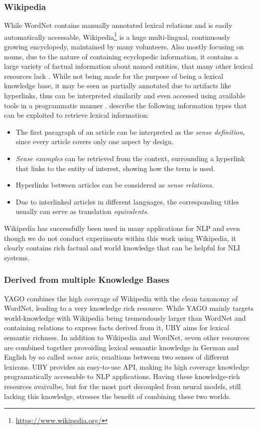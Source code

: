 \subsubsection{Wikipedia}\label{sec:wikipedia}
While WordNet contains manually annotated lexical relations and is easily automatically accessable, Wikipedia\footnote{\href{https://www.wikipedia.org/}{https://www.wikipedia.org/}} is a huge multi-lingual, continuously growing  encyclopedy, maintained by many volunteers. Also mostly focusing on nouns, due to the nature of containing ecyclopedic information, it contains a large variety of factual information about named entities, that many other lexical resources lack \citep{gurevych2016linked}. While not being made for the purpose of being a lexical knowledge base, it may be seen as partially annotated due to artifacts like hyperlinks, thus can be interpreted similarily and even accessed using available tools in a programmatic manner \citep{zesch2008extracting}.  \cite{gurevych2016linked} describe the following information types that can be exploited to retrieve lexical information:
\begin{itemize}
\item The first paragraph of an article can be interpreted as the \textit{sense definition}, since every article covers only one aspect by design.
\item \textit{Sense examples} can be retrieved from the context, surrounding a hyperlink that links to the entity of interest, showing how the term is used.
\item Hyperlinks between articles can be considered as \textit{sense relations}.
\item Due to interlinked articles in different languages, the corresponding titles usually can serve as translation \textit{equivalents}.
\end{itemize}
Wikipedia has successfully been used in many applications for \ac{NLP} and even though we do not conduct experiments within this work using Wikipedia, it clearly contains rich factual and world knowledge that can be helpful for \ac{NLI} systems. 
\subsubsection{Derived from multiple Knowledge Bases}
\ac{YAGO} \citep{suchanek2007yago} combines the high coverage of Wikipedia with the clean taxonomy of WordNet, leading to a very knowledge rich resource. While \ac{YAGO} mainly targets world-knowledge with Wikipedia being tremendously larger than WordNet and containing relations to express facts derived from it, UBY \citep{gurevych2012uby} aims for lexical semantic richness. In addition to Wikipedia and WordNet, seven other resources are combined together provoiding lexical semantic knowledge in German and English by so called \textit{sense axis}, reaaltions betweem two senses of different lexicons. UBY provides an easy-to-use API, making its high coverage knowledge programatically accessable to \ac{NLP} applications. Having these knowledge-rich resources avaivalbe, but for the most part decoupled from neural models, still lacking this knowledge, stresses the benefit of combining these two worlds. 

